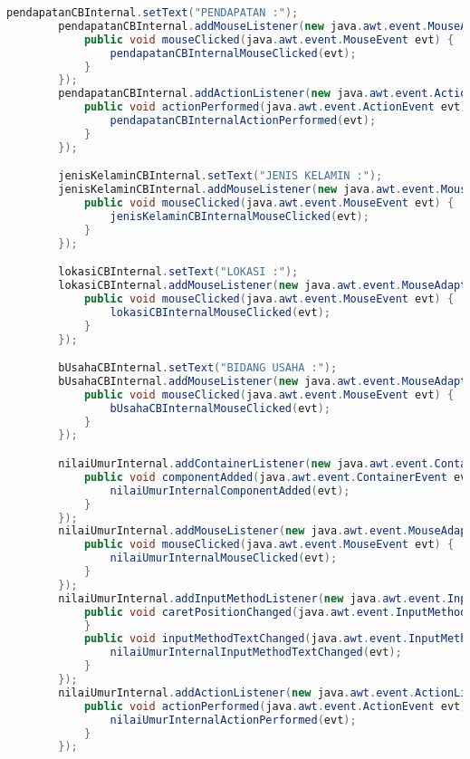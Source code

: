 \begin{lstlisting}[language=Java, caption=TampilanBobotKetetanggaan.java]
        pendapatanCBInternal.setText("PENDAPATAN :");
        pendapatanCBInternal.addMouseListener(new java.awt.event.MouseAdapter() {
            public void mouseClicked(java.awt.event.MouseEvent evt) {
                pendapatanCBInternalMouseClicked(evt);
            }
        });
        pendapatanCBInternal.addActionListener(new java.awt.event.ActionListener() {
            public void actionPerformed(java.awt.event.ActionEvent evt) {
                pendapatanCBInternalActionPerformed(evt);
            }
        });

        jenisKelaminCBInternal.setText("JENIS KELAMIN :");
        jenisKelaminCBInternal.addMouseListener(new java.awt.event.MouseAdapter() {
            public void mouseClicked(java.awt.event.MouseEvent evt) {
                jenisKelaminCBInternalMouseClicked(evt);
            }
        });

        lokasiCBInternal.setText("LOKASI :");
        lokasiCBInternal.addMouseListener(new java.awt.event.MouseAdapter() {
            public void mouseClicked(java.awt.event.MouseEvent evt) {
                lokasiCBInternalMouseClicked(evt);
            }
        });

        bUsahaCBInternal.setText("BIDANG USAHA :");
        bUsahaCBInternal.addMouseListener(new java.awt.event.MouseAdapter() {
            public void mouseClicked(java.awt.event.MouseEvent evt) {
                bUsahaCBInternalMouseClicked(evt);
            }
        });

        nilaiUmurInternal.addContainerListener(new java.awt.event.ContainerAdapter() {
            public void componentAdded(java.awt.event.ContainerEvent evt) {
                nilaiUmurInternalComponentAdded(evt);
            }
        });
        nilaiUmurInternal.addMouseListener(new java.awt.event.MouseAdapter() {
            public void mouseClicked(java.awt.event.MouseEvent evt) {
                nilaiUmurInternalMouseClicked(evt);
            }
        });
        nilaiUmurInternal.addInputMethodListener(new java.awt.event.InputMethodListener() {
            public void caretPositionChanged(java.awt.event.InputMethodEvent evt) {
            }
            public void inputMethodTextChanged(java.awt.event.InputMethodEvent evt) {
                nilaiUmurInternalInputMethodTextChanged(evt);
            }
        });
        nilaiUmurInternal.addActionListener(new java.awt.event.ActionListener() {
            public void actionPerformed(java.awt.event.ActionEvent evt) {
                nilaiUmurInternalActionPerformed(evt);
            }
        });


\end{lstlisting}
